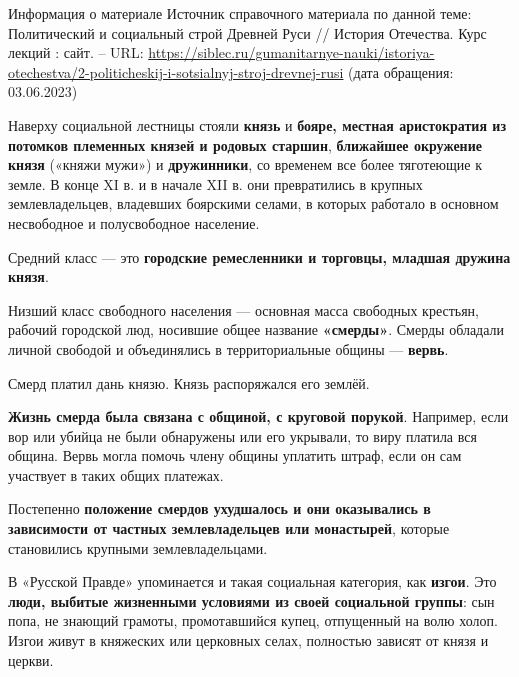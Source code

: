 \documentclass{article}
\begin{document}
\begin{bclogo}[logo=\bcinfo, couleurBarre=orange, noborder=true, couleur=white]{Информация о материале}
    Источник справочного материала по данной теме: Политический и социальный строй Древней Руси // История Отечества. Курс лекций : сайт. – URL: \href{https://siblec.ru/gumanitarnye-nauki/istoriya-otechestva/2-politicheskij-i-sotsialnyj-stroj-drevnej-rusi}{https://siblec.ru/gumanitarnye-nauki/istoriya-otechestva/2-politicheskij-i-sotsialnyj-stroj-drevnej-rusi} (дата обращения: 03.06.2023)
\end{bclogo}

Наверху социальной лестницы стояли \textbf{князь} и \textbf{бояре, местная аристократия из потомков племенных князей и родовых старшин}, \textbf{ближайшее окружение князя} («княжи мужи») и \textbf{дружинники}, со временем все более тяготеющие к земле. В конце XI в. и в начале XII в. они превратились в крупных землевладельцев, владевших боярскими селами, в которых работало в основном несвободное и полусвободное население.

\hfill

Средний класс — это \textbf{городские ремесленники и торговцы, младшая дружина князя}.

\hfill

Низший класс свободного населения — основная масса свободных крестьян, рабочий городской люд, носившие общее название \textbf{«смерды»}. Смерды обладали личной свободой и объединялись в территориальные общины — \textbf{вервь}.

Смерд платил дань князю. Князь распоряжался его землёй.

\textbf{Жизнь смерда была связана с общиной, с круговой порукой}. Например, если вор или убийца не были обнаружены или его укрывали, то виру платила вся община. Вервь могла помочь члену общины уплатить штраф, если он сам участвует в таких общих платежах.

Постепенно \textbf{положение смердов ухудшалось и они оказывались в зависимости от частных землевладельцев или монастырей}, которые становились крупными землевладельцами.

\hfill

В «Русской Правде» упоминается и такая социальная категория, как \textbf{изгои}. Это \textbf{люди, выбитые жизненными условиями из своей социальной группы}: сын попа, не знающий грамоты, промотавшийся купец, отпущенный на волю холоп. Изгои живут в княжеских или церковных селах, полностью зависят от князя и церкви.

\hfill
\end{document}
